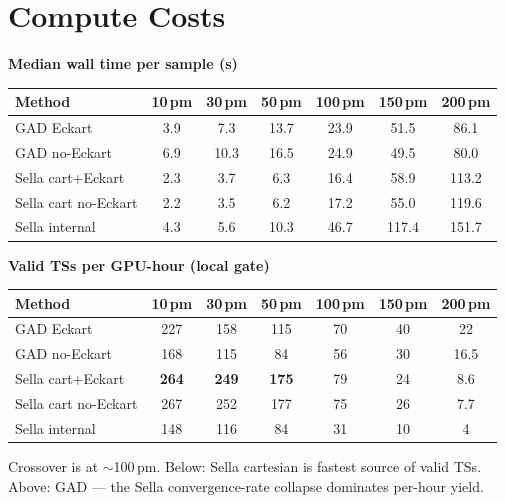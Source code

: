 \documentclass[11pt]{article}
\begin{document}
\newpage
\clearpage
\section{Compute Costs}

\begin{center}
\textbf{Median wall time per sample (s)} \\[0.3em]
\begin{tabular}{l|cccccc}
\toprule
Method & 10\,pm & 30\,pm & 50\,pm & 100\,pm & 150\,pm & 200\,pm \\
\midrule
GAD Eckart                  & 3.9 & 7.3 & 13.7 & 23.9 & 51.5 & 86.1 \\
GAD no-Eckart               & 6.9 & 10.3 & 16.5 & 24.9 & 49.5 & 80.0 \\
Sella cart+Eckart           & 2.3 & 3.7 & 6.3 & 16.4 & 58.9 & 113.2 \\
Sella cart no-Eckart        & 2.2 & 3.5 & 6.2 & 17.2 & 55.0 & 119.6 \\
Sella internal              & 4.3 & 5.6 & 10.3 & 46.7 & 117.4 & 151.7 \\
\bottomrule
\end{tabular}
\end{center}

\begin{center}
\textbf{Valid TSs per GPU-hour (local gate)} \\[0.3em]
\begin{tabular}{l|cccccc}
\toprule
Method & 10\,pm & 30\,pm & 50\,pm & 100\,pm & 150\,pm & 200\,pm \\
\midrule
GAD Eckart                  & 227 & 158 & 115 & 70 & 40 & 22 \\
GAD no-Eckart               & 168 & 115 & 84 & 56 & 30 & 16.5 \\
Sella cart+Eckart           & \textbf{264} & \textbf{249} & \textbf{175} & 79 & 24 & 8.6 \\
Sella cart no-Eckart        & 267 & 252 & 177 & 75 & 26 & 7.7 \\
Sella internal              & 148 & 116 & 84 & 31 & 10 & 4 \\
\bottomrule
\end{tabular}
\end{center}

Crossover is at $\sim$100\,pm. Below: Sella cartesian is fastest source
of valid TSs. Above: GAD --- the Sella convergence-rate collapse
dominates per-hour yield.
\end{document}
